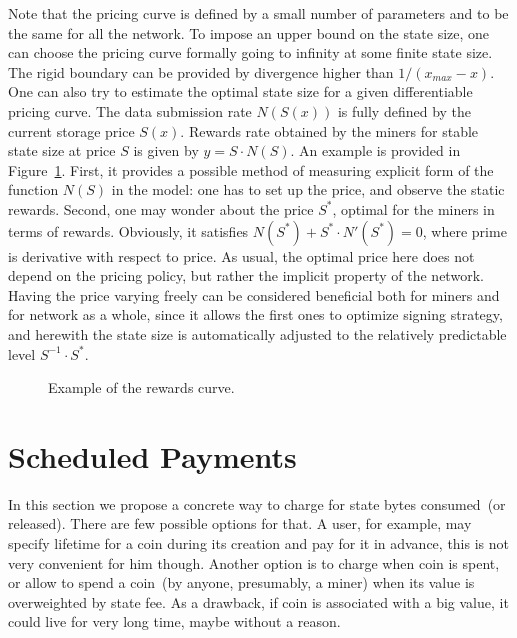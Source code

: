 \documentclass[]{llncs}   %
\begin{document}
Note that the pricing curve is defined by a small number of parameters and
to be the same for all the network. To impose an upper bound on the state
size, one can choose the pricing curve formally going to infinity at some finite
state size. The rigid boundary can be provided by divergence higher than
$1/(x_{max}-x)$. One can also try to estimate the optimal state size for a given
differentiable pricing curve. 
The data submission rate $N(S(x))$ is fully defined by the
current storage price $S(x)$.  Rewards rate obtained by the miners for stable
state size at price $S$ is given by $y = S \cdot N(S)$. An example is provided in
Figure~\ref{fig:rewards}. First, it provides a possible method of measuring
explicit form of the function $N(S)$ in the model: one has to set up the price,
and observe the static rewards. Second, one may wonder about the price $S^*$,
optimal for the miners in terms of rewards. Obviously, it satisfies
$N(S^*)+S^* \cdot N'(S^*)=0$, where prime is derivative with respect to price. As
usual, the optimal price here does not depend on the pricing policy, but rather
the implicit property of the network. Having the price varying freely can be
considered beneficial both for miners and for network as a whole, since it
allows the first ones to optimize signing strategy, and herewith the
state size is automatically adjusted to the relatively predictable level
$S^{-1} \cdot S^*$.

\begin{figure}[H]
    
    \caption{
        \label{fig:rewards} Example of the rewards curve.
    }
\end{figure}

\section{Scheduled Payments}
\label{sec:scheduled}

In this section we propose a concrete way to charge for state bytes consumed~(or released). There are few possible options for that. A user, for example, may specify lifetime for a coin during its creation and pay for it in advance, this is not very convenient for him though. Another option is to charge when coin is spent, or allow to spend a coin~(by anyone, presumably, a miner) when its value is overweighted by state fee. As a drawback, if coin is associated with a big value, it could live for very long time, maybe without a reason.
\end{document}
